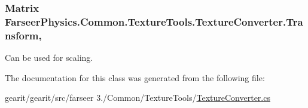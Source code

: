 \hypertarget{class_farseer_physics_1_1_common_1_1_texture_tools_1_1_texture_converter_a69dd8362fb1e579191fb62f8a6ae1359}{
\subsubsection[{Transform}]{\setlength{\rightskip}{0pt plus 5cm}Matrix Farseer\+Physics.\+Common.\+Texture\+Tools.\+Texture\+Converter.\+Transform\hspace{0.3cm}{\ttfamily [get]}, {\ttfamily [set]}}}\label{class_farseer_physics_1_1_common_1_1_texture_tools_1_1_texture_converter_a69dd8362fb1e579191fb62f8a6ae1359}


Can be used for scaling. 



The documentation for this class was generated from the following file\+:\begin{DoxyCompactItemize}
\item 
gearit/gearit/src/farseer 3./\+Common/\+Texture\+Tools/\hyperlink{_texture_converter_8cs}{Texture\+Converter.\+cs}\end{DoxyCompactItemize}
